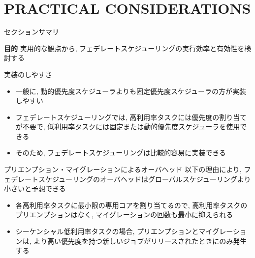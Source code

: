 
\section{PRACTICAL CONSIDERATIONS}
\label{sec: Practical Considerations}

\begin{frame}{セクションサマリ}
    \begin{itembox}[l]{\textbf{目的}}
        実用的な観点から, フェデレートスケジューリングの実行効率と有効性を検討する
    \end{itembox}
\end{frame}


\begin{frame}{実装のしやすさ}
    \begin{itemize}
        \item 一般に, 動的優先度スケジューラよりも固定優先度スケジューラの方が実装しやすい
        \item フェデレートスケジューリングでは, 高利用率タスクには優先度の割り当てが不要で, 低利用率タスクには固定または動的優先度スケジューラを使用できる
        \item そのため, フェデレートスケジューリングは比較的容易に実装できる
    \end{itemize}
\end{frame}

\begin{frame}{プリエンプション・マイグレーションによるオーバヘッド}
    以下の理由により, フェデレートスケジューリングのオーバヘッドはグローバルスケジューリングより小さいと予想できる
    \begin{itemize}
        \item 各高利用率タスクに最小限の専用コアを割り当てるので, 高利用率タスクのプリエンプションはなく, マイグレーションの回数も最小に抑えられる
        \item シーケンシャル低利用率タスクの場合, プリエンプションとマイグレーションは, より高い優先度を持つ新しいジョブがリリースされたときにのみ発生する
    \end{itemize}
\end{frame}

